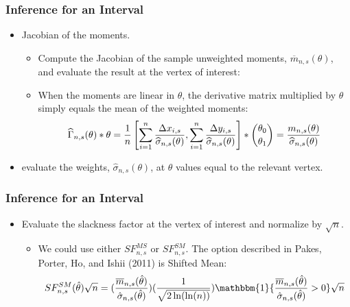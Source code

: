 \documentclass[notes=show]{beamer}
\begin{document}
\begin{frame}
\frametitle{Inference for an Interval}

\begin{itemize}
\item Jacobian of the moments. 

\begin{itemize}
\item Compute the Jacobian of the sample unweighted moments, $\overline{m}%
_{n,s}(\theta)$, and evaluate the result at the vertex of interest: 

\item When the moments are linear in $\theta $, the derivative matrix
multiplied by $\theta $ simply equals the mean of the weighted moments:%
\begin{equation*}
\widehat{\Gamma }_{n,s}(\theta )\ast \theta =\frac{1}{n}\left[
\sum_{i=1}^{n}\frac{\Delta x_{i,s}}{\widehat{\sigma }_{n,s}(\theta )}%
,\sum_{i=1}^{n}\frac{\Delta y_{i,s}}{\widehat{\sigma }_{n,s}(\theta )%
}\right] \ast \binom{\theta _{0}}{\theta _{1}}=\frac{m_{n,s}(\theta )}{%
\widehat{\sigma }_{n,s}(\theta )}
\end{equation*}
\end{itemize}

\item evaluate the weights, $\widehat{\sigma }_{n,s}(\theta )$, at $\theta $
values equal to the relevant vertex.
\end{itemize}
\end{frame}


\begin{frame}
\frametitle{Inference for an Interval}

\begin{itemize}
\item Evaluate the slackness factor at the vertex of interest and normalize
by $\sqrt{n}$. 

\begin{itemize}
\item We could use either $SF_{n,s}^{MS}$ or $SF_{n,s}^{SM}$.\newline
The option described in Pakes, Porter, Ho, and Ishii (2011) is Shifted Mean: 
\begin{equation*}
SF_{n,s}^{SM}(\hat{\theta})\sqrt{n}=(\frac{\overline{m}_{n,s}(\hat{\theta})}{%
\hat{\sigma}_{n,s}(\hat{\theta})})(\frac{1}{\sqrt{2\ln (\ln (n))}})%
\mathbbm{1}\{\frac{\overline{m}_{n,s}(\hat{\theta})}{\hat{\sigma}_{n,s}(\hat{%
\theta})}>0\}\sqrt{n}
\end{equation*}
\end{itemize}
\end{itemize}
\end{frame}
\end{document}
